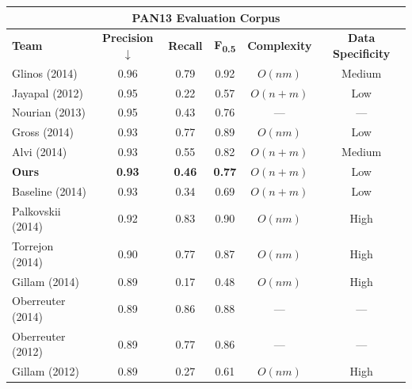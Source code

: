 \begin{table}[th]
\centering
\begin{tabular}{@{}l*{3}{c}cc@{}}
\multicolumn{6}{c}{\textsf{\textbf{PAN13 Evaluation Corpus}}} \\[1.1ex]
\toprule
\textsf{\textbf{Team}}  & \textsf{\textbf{Precision$\downarrow$}} & \textsf{\textbf{Recall }}       & \textsf{\textbf{F\textsubscript{0.5}}}         & \textsf{\textbf{Complexity}}    & \textsf{\textbf{Data Specificity}}  \\
\midrule
        Glinos (2014)   &       0.96            &    0.79       &  0.92             & $O(nm)$       & Medium            \\
       Jayapal (2012)   &       0.95            &    0.22       &  0.57             & $O(n+m)$      & Low               \\
       Nourian (2013)   &       0.95            &    0.43       &  0.76             & ---           & ---               \\
         Gross (2014)   &       0.93            &    0.77       &  0.89             & $O(nm)$       & Low               \\
         Alvi (2014)    &       0.93            &    0.55       &  0.82             & $O(n+m)$      & Medium            \\
        \textbf{Ours}   &\textbf{0.93}          &\textbf{0.46}  &  \textbf{0.77}    & $O(n+m)$      & Low               \\
      Baseline (2014)   &       0.93            &    0.34       &  0.69             & $O(n+m)$      & Low               \\
    Palkovskii (2014)   &       0.92            &    0.83       &  0.90             & $O(nm)$       & High              \\
      Torrejon (2014)   &       0.90            &    0.77       &  0.87             & $O(nm)$       & High              \\
        Gillam (2014)   &       0.89            &    0.17       &  0.48             & $O(nm)$       & High              \\ %
    Oberreuter (2014)   &       0.89            &    0.86       &  0.88             & ---           & ---               \\
    Oberreuter (2012)   &       0.89            &    0.77       &  0.86             & ---           & ---               \\ %
        Gillam (2012)   &       0.89            &    0.27       &  0.61             & $O(nm)$       & High              \\ %

\end{tabular}
\end{table}

